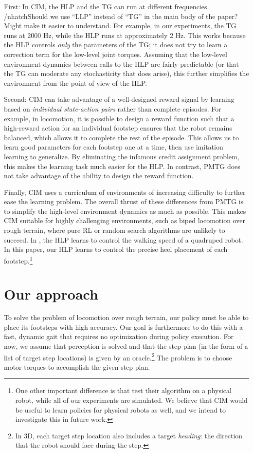 \documentclass[a4paper]{article}
\begin{document}
First: In CIM, the HLP and the TG can run at different frequencies.
/nhatch{Should we use ``LLP'' instead of ``TG'' in the main body of the paper? Might make it easier to understand.}
For example, in our experiments, the TG runs at 2000 Hz, while the HLP runs at approximately 2 Hz.
This works because the HLP controls \emph{only} the parameters of the TG; it does not try to learn a correction term for the low-level joint torques.
Assuming that the low-level environment dynamics between calls to the HLP are fairly predictable (or that the TG can moderate any stochasticity that does arise), this further simplifies the environment from the point of view of the HLP.

Second: CIM can take advantage of a well-designed reward signal by learning based on \emph{individual state-action pairs} rather than complete episodes.
For example, in locomotion, it is possible to design a reward function such that a high-reward action for an individual footstep ensures that the robot remains balanced, which allows it to complete the rest of the episode.
This allows us to learn good parameters for each footstep one at a time, then use imitation learning to generalize.
By eliminating the infamous credit assignment problem, this makes the learning task much easier for the HLP.
In contrast, PMTG does not take advantage of the ability to design the reward function.

Finally, CIM uses a curriculum of environments of increasing difficulty to further ease the learning problem.
The overall thrust of these differences from PMTG is to simplify the high-level environment dynamics as much as possible.
This makes CIM suitable for highly challenging environments, such as biped locomotion over rough terrain, where pure RL or random search algorithms are unlikely to succeed.
In \citet{iscen2018pmtg}, the HLP learns to control the walking speed of a quadruped robot.
In this paper, our HLP learns to control the precise heel placement of each footstep.\footnote{
One other important difference is that \citet{iscen2018pmtg} test their algorithm on a physical robot, while all of our experiments are simulated.
We believe that CIM would be useful to learn policies for physical robots as well, and we intend to investigate this in future work.}


\section{Our approach}

To solve the problem of locomotion over rough terrain, our policy must be able to place its footsteps with high accuracy.
Our goal is furthermore to do this with a fast, dynamic gait that requires no optimization during policy execution.
For now, we assume that perception is solved and that the step plan (in the form of a list of target step locations) is given by an oracle.\footnote{
In 3D, each target step location also includes a target \emph{heading}: the direction that the robot should face during the step.}
The problem is to choose motor torques to accomplish the given step plan.
\end{document}
